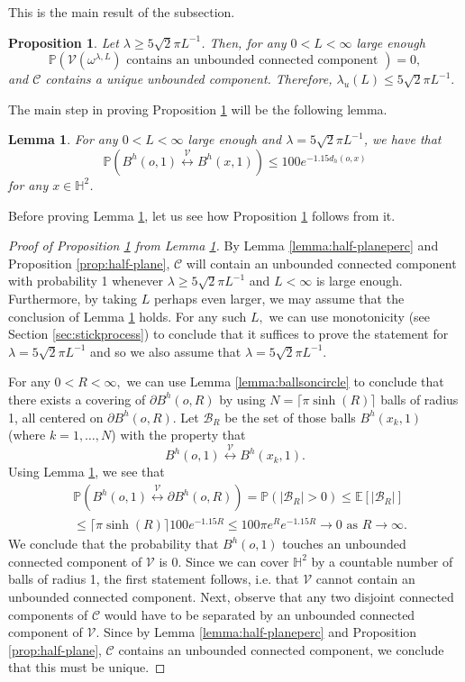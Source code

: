 \documentclass[a4paper,12pt]{article}
\newcommand{\BE}{{\mathbb{E}}}
\newcommand{\BH}{{\mathbb{H}}}
\newcommand{\BP}{{\mathbb{P}}}
\newcommand{\CB}{{\mathcal{B}}}
\newcommand{\CC}{{\mathcal{C}}}
\newcommand{\CV}{{\mathcal{V}}}
\newtheorem{proposition}[theorem]{Proposition}
\newtheorem{lemma}[theorem]{Lemma}
\begin{document}
This is the main result of the subsection.
\begin{proposition} \label{prop:lambdauupperbound}
Let $\lambda \geq 5 \sqrt{2} \pi L^{-1}$. Then, for any $0<L<\infty$ large enough
\[
\BP(\CV(\omega^{\lambda,L}) \textrm{ contains an unbounded connected component })=0,
\]
and $\CC$ contains a unique unbounded component. 
Therefore, $\lambda_u(L) \leq 5 \sqrt{2} \pi L^{-1}.$
\end{proposition}
The main step in proving Proposition \ref{prop:lambdauupperbound} will be the following lemma.
\begin{lemma} \label{lemma:Vconnect}
For any $0<L<\infty$ large enough and $\lambda=5 \sqrt{2} \pi L^{-1}$,
we have that
\[
\BP(B^h(o,1) \stackrel{\CV}{\longleftrightarrow} B^h(x,1))
\leq 100e^{-1.15 d_h(o,x)}
\]
for any $x\in \BH^2$.
\end{lemma}
Before proving Lemma \ref{lemma:Vconnect}, let us see how Proposition 
\ref{prop:lambdauupperbound} follows from it.
\begin{proof}[Proof of Proposition \ref{prop:lambdauupperbound} from Lemma \ref{lemma:Vconnect}]
By Lemma \ref{lemma:half-planeperc} and Proposition \ref{prop:half-plane}, 
$\CC$ will contain an unbounded connected 
component with probability 1 whenever $\lambda \geq 5 \sqrt{2} \pi L^{-1}$ 
and $L<\infty$ is large enough. Furthermore, by taking $L$ perhaps even larger, 
we may assume that the conclusion of Lemma \ref{lemma:Vconnect} holds. For any such 
$L,$ we can use monotonicity (see Section \ref{sec:stickprocess}) to conclude 
that it suffices to prove 
the statement for $\lambda=5 \sqrt{2} \pi L^{-1}$ and so  
we also assume that $\lambda=5 \sqrt{2} \pi L^{-1}.$

For any $0<R<\infty,$ we can use Lemma \ref{lemma:ballsoncircle} to conclude that there exists a 
covering of $\partial B^h(o,R)$ by using $N=\lceil \pi \sinh(R) \rceil$ balls of radius 1, 
all centered on $\partial B^h(o,R)$. 
Let $\CB_R$ be the set of those balls $B^h(x_k,1)$ (where $k=1,\ldots,N$) with the 
property that 
\[
B^h(o,1) \stackrel{\CV}{\longleftrightarrow} B^h(x_k,1).
\]
Using Lemma \ref{lemma:Vconnect}, we see that 
\begin{align*}
& \BP(B^h(o,1) \stackrel{\CV}{\longleftrightarrow} \partial B^h(o,R))
=\BP(|\CB_R|>0)  
\leq \BE[|\CB_R|] \\
& \leq \lceil \pi \sinh(R) \rceil 100 e^{-1.15R}
\leq 100 \pi e^R e^{-1.15R} 
\to 0 \textrm{ as } R \to \infty.
\end{align*}
We conclude that the probability that $B^h(o,1)$ touches an unbounded connected component 
of $\CV$ is 0. 
Since we can cover $\BH^2$ by a countable number of balls of radius 1, the first statement 
follows, i.e. that $\CV$ cannot contain an unbounded connected component. 
Next, observe that any two disjoint connected components of 
$\CC$ would have to be separated by an unbounded connected component of $\CV.$
Since by Lemma \ref{lemma:half-planeperc} and Proposition \ref{prop:half-plane}, 
$\CC$ contains an unbounded connected
component, we conclude that this must be unique.
\end{proof}
\end{document}
